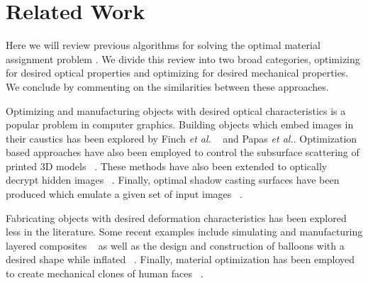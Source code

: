 \documentclass[annual]{acmsiggraph}
\begin{document}
\section{Related Work} 
Here we will review previous algorithms for solving the optimal material assignment problem . We divide this review into two broad categories, optimizing for desired optical properties and optimizing for desired mechanical properties. We conclude by commenting on the similarities between these approaches.

Optimizing and manufacturing objects with desired optical characteristics is a popular problem in computer graphics. Building objects which embed images in their caustics has been explored by Finch \textit{et al.} ~ and Papas \textit{et al.}. Optimization based approaches have also been employed to control the subsurface scattering of printed 3D models ~\cite{Hasan:2010}. These methods have also been extended to optically decrypt hidden images ~\cite{Papas:2012}. Finally, optimal shadow casting surfaces have been produced which emulate a given set of input images ~\cite{Bermano:2012}.

Fabricating objects with desired deformation characteristics has been explored less in the literature. Some recent examples include simulating and manufacturing layered composites ~\cite{Bickel:2010} as well as the design and construction of balloons with a desired shape while inflated ~\cite{sko:2012}. Finally, material optimization has been employed to create mechanical clones of human faces ~\cite{Bickel:2012}.
\end{document}
